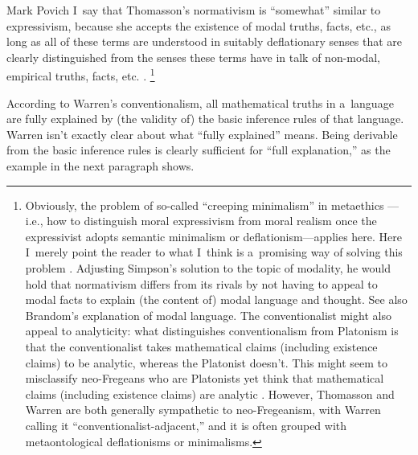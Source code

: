 \begin{artengenv}{Mark Povich}
I~say that Thomasson's normativism is ``somewhat'' similar to expressivism, because she accepts the existence of modal truths, facts, etc., as long as all of these terms are understood in suitably deflationary senses that are clearly distinguished from the senses these terms have in talk of non-modal, empirical truths, facts, etc.
\parencites[][]{thomasson_norms_2020}[see also][]{baker_mathematical_2009}.%
\footnote{Obviously, the problem of so-called ``creeping minimalism'' in metaethics 
\parencite[][]{dreier_metaethics_2004}%
---i.e., how to distinguish moral expressivism from moral realism once the expressivist adopts semantic minimalism or deflationism---applies here. Here I~merely point the reader to what I~think is a~promising way of solving this problem 
\parencite[][]{simpson_creeping_2020}. %
 Adjusting Simpson's solution to the topic of modality, he would hold that normativism differs from its rivals by not having to appeal to modal facts to explain (the content of) modal language and thought. See also Brandom's 
\parencite*[][]{brandom_between_2008} %
 explanation of modal language. The conventionalist might also appeal to analyticity: what distinguishes conventionalism from Platonism is that the conventionalist takes mathematical claims (including existence claims) to be analytic, whereas the Platonist doesn't. This might seem to misclassify neo-Fregeans who are Platonists yet think that mathematical claims (including existence claims) are analytic 
\parencite[e.g.,][]{hale_reasons_2001}.
 However, Thomasson 
\parencite*[][]{thomasson_ontology_2014} %
 and Warren 
\parencite*[][]{warren_shadows_2020} %
 are both generally sympathetic to neo-Fregeanism, with Warren 
\parencite*[][pp.198, 203]{warren_shadows_2020} %
 calling it ``conventionalist-adjacent,'' and it is often grouped with metaontological deflationisms or minimalisms.}

According to Warren's
\parencite*[][]{warren_shadows_2020} %
 conventionalism, all mathematical truths in a~language are fully explained by (the validity of) the basic inference rules of that language. Warren isn't exactly clear about what ``fully explained'' means. Being derivable from the basic inference rules is clearly sufficient for ``full explanation,'' as the example in the next paragraph shows.


\end{artengenv}

